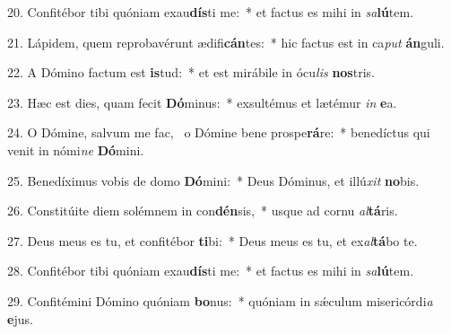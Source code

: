 20. Confitébor tibi quóniam exau\textbf{dís}ti me:~*  et factus es mihi in \textit{sa}\textbf{lú}tem.\

21. Lápidem, quem reprobavérunt ædifi\textbf{cán}tes:~*  hic factus est in ca\textit{put} \textbf{án}guli.\

22. A Dómino factum est \textbf{is}tud:~*  et est mirábile in ócu\textit{lis} \textbf{nos}tris.\

23. Hæc est dies, quam fecit \textbf{Dó}minus:~*  exsultémus et lætémur \textit{in} \textbf{e}a.\

24. O Dómine, salvum me fac, \dag\  o Dómine bene prospe\textbf{rá}re:~*  benedíctus qui venit in nómi\textit{ne} \textbf{Dó}mini.\

25. Benedíximus vobis de domo \textbf{Dó}mini:~*  Deus Dóminus, et illú\textit{xit} \textbf{no}bis.\

26. Constitúite diem solémnem in con\textbf{dén}sis,~*  usque ad cornu \textit{al}\textbf{tá}ris.\

27. Deus meus es tu, et confitébor \textbf{ti}bi:~*  Deus meus es tu, et ex\textit{al}\textbf{tá}bo te.\

28. Confitébor tibi quóniam exau\textbf{dís}ti me:~*  et factus es mihi in \textit{sa}\textbf{lú}tem.\

29. Confitémini Dómino quóniam \textbf{bo}nus:~*  quóniam in sǽculum misericórdi\textit{a} \textbf{e}jus.\

